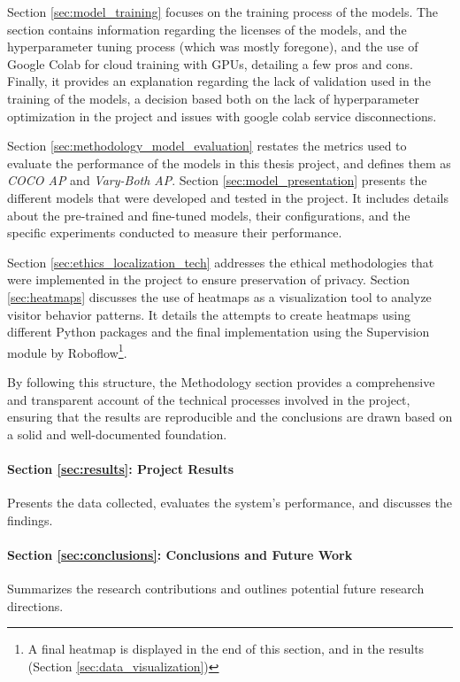 Section \ref{sec:model_training} focuses on the training process of the models. The section contains information regarding the licenses of the models, and the hyperparameter tuning process (which was mostly foregone), and the use of Google Colab for cloud training with GPUs, detailing a few pros and cons. Finally, it provides an explanation regarding the lack of validation used in the training of the models, a decision based both on the lack of hyperparameter optimization in the project and issues with google colab service disconnections. 

Section \ref{sec:methodology_model_evaluation} restates the metrics used to evaluate the performance of the models in this thesis project, and defines them as \textit{COCO AP} and \textit{Vary-Both AP}. Section \ref{sec:model_presentation} presents the different models that were developed and tested in the project. It includes details about the pre-trained and fine-tuned models, their configurations, and the specific experiments conducted to measure their performance.

Section \ref{sec:ethics_localization_tech} addresses the ethical methodologies that were implemented in the project to ensure preservation of privacy. Section \ref{sec:heatmaps} discusses the use of heatmaps as a visualization tool to analyze visitor behavior patterns. It details the attempts to create heatmaps using different Python packages and the final implementation using the Supervision module by Roboflow\footnote{A final heatmap is displayed in the end of this section, and in the results (Section \ref{sec:data_visualization})}.

By following this structure, the Methodology section provides a comprehensive and transparent account of the technical processes involved in the project, ensuring that the results are reproducible and the conclusions are drawn based on a solid and well-documented foundation. 

\paragraph{Section \ref{sec:results}: Project Results} 
Presents the data collected, evaluates the system's performance, and discusses the findings.

\paragraph{Section \ref{sec:conclusions}: Conclusions and Future Work} 
Summarizes the research contributions and outlines potential future research directions.

